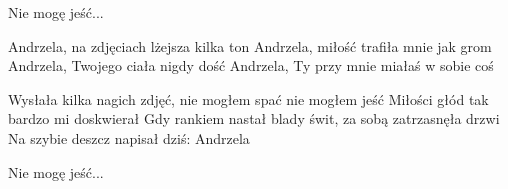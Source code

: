 \documentclass[../../../songbook.tex]{subfiles}
\begin{document}
\-\hspace{1cm} Nie mogę jeść...					\newline
 
Andrzela, na zdjęciach lżejsza kilka ton			\newline
Andrzela, miłość trafiła mnie jak grom				\newline
Andrzela, Twojego ciała nigdy dość					\newline
Andrzela, Ty przy mnie miałaś w sobie coś			\newline
  
Wysłała kilka nagich zdjęć, nie mogłem spać nie mogłem jeść	\newline
Miłości głód tak bardzo mi doskwierał						\newline
Gdy rankiem nastał blady świt, za sobą zatrzasnęła drzwi	\newline
Na szybie deszcz napisał dziś: Andrzela						\newline
 
\-\hspace{1cm} Nie mogę jeść...
\end{document}
